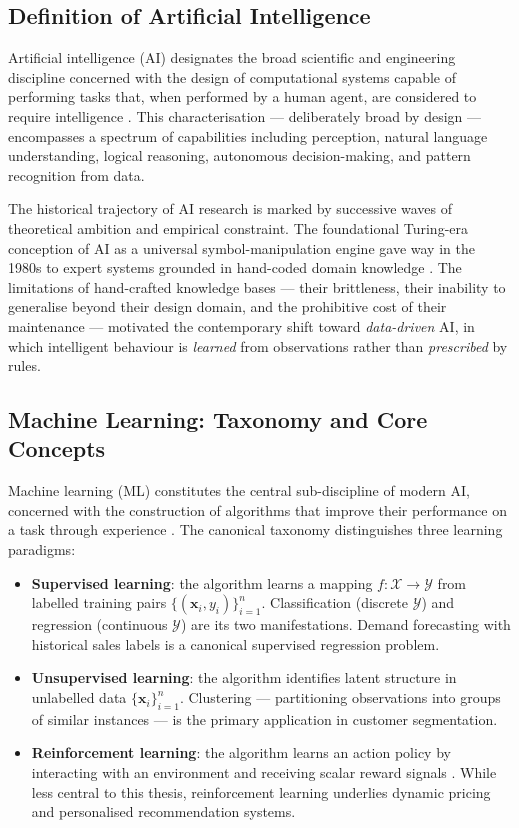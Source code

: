 \subsection{Definition of Artificial Intelligence}

Artificial intelligence (AI) designates the broad scientific and engineering discipline concerned with the design of computational systems capable of performing tasks that, when performed by a human agent, are considered to require intelligence \cite{RussellNorvig2020}. This characterisation — deliberately broad by design — encompasses a spectrum of capabilities including perception, natural language understanding, logical reasoning, autonomous decision-making, and pattern recognition from data.

The historical trajectory of AI research is marked by successive waves of theoretical ambition and empirical constraint. The foundational Turing-era conception of AI as a universal symbol-manipulation engine gave way in the 1980s to expert systems grounded in hand-coded domain knowledge \cite{Luger2009}. The limitations of hand-crafted knowledge bases — their brittleness, their inability to generalise beyond their design domain, and the prohibitive cost of their maintenance — motivated the contemporary shift toward \textit{data-driven} AI, in which intelligent behaviour is \textit{learned} from observations rather than \textit{prescribed} by rules.

\subsection{Machine Learning: Taxonomy and Core Concepts}

Machine learning (ML) constitutes the central sub-discipline of modern AI, concerned with the construction of algorithms that improve their performance on a task through experience \cite{Mitchell1997}. The canonical taxonomy distinguishes three learning paradigms:

\begin{itemize}[noitemsep]
    \item \textbf{Supervised learning}: the algorithm learns a mapping $f: \mathcal{X} \rightarrow \mathcal{Y}$ from labelled training pairs $\{(\mathbf{x}_i, y_i)\}_{i=1}^n$. Classification (discrete $\mathcal{Y}$) and regression (continuous $\mathcal{Y}$) are its two manifestations. Demand forecasting with historical sales labels is a canonical supervised regression problem.

    \item \textbf{Unsupervised learning}: the algorithm identifies latent structure in unlabelled data $\{\mathbf{x}_i\}_{i=1}^n$. Clustering — partitioning observations into groups of similar instances — is the primary application in customer segmentation.

    \item \textbf{Reinforcement learning}: the algorithm learns an action policy by interacting with an environment and receiving scalar reward signals \cite{suttonbarto2018}. While less central to this thesis, reinforcement learning underlies dynamic pricing and personalised recommendation systems.
\end{itemize}

